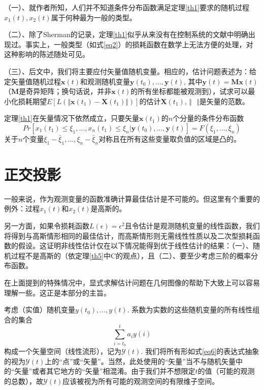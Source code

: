 \documentclass[UTF8,adobefonts]{ctexart}
\begin{document}
{}（一）、就作者所知，人们并不知道条件分布函数满足定理\ref{th1}要求的随机过程${x_1(t),x_2(t)}$属于何种最为一般的类型。

（二）、除了Sherman的记录，定理\ref{th1}似乎从来没有在控制系统的文献中明确出现过。事实上，一般类型（如式\ref{eq2}）的损耗函数在数学上无法方便的处理，对这种影响的陈述随处可见。

（三）、后文中，我们将主要应付矢量值随机变量。相应的，估计问题表述为：给定矢量值随机过程${\mathbf{x}(t)}$和观测随机变量$\mathbf{y}(t_0),\dotsc,\mathbf{y}(t)$, 其中$\mathbf{y}(t)=\mathbf{Mx}(t)$（$\mathbf{M}$是奇异矩阵；换句话说，并非$\mathbf{x}(t)$的所有坐标都能被观测到），试求可以最小化损耗期望$E[L(\Vert\mathbf{x}(t_1)-\mathbf{X}(t_1)\Vert)]$的估计$\mathbf{X}(t_1)$, $\Vert\text{ }\Vert$是矢量的范数。

定理\ref{th1}在矢量情况下依然成立，只要矢量$\mathbf{x}(t_1)$的$n$个分量的条件分布函数
\begin{equation*}
Pr[x_1(t_1) \le \xi_1,\dotsc,x_n(t_1) \le \xi_n \vert \mathbf{y}(t_0),\dotsc,\mathbf{y}(t)]=F(\xi_1,\dotsc,\xi_n)
\end{equation*}
关于$n$个变量$\xi_1-\bar{\xi}_1,\dotsc,\xi_n-\bar{\xi}_n$对称且在所有这些变量取负值的区域是凸的。


\section{正交投影}
一般来说，作为观测变量的函数准确计算最佳估计是不可能的。但这里有个重要的例外：过程${x_1(t)}$和${x_2(t)}$是高斯的。

另一方面，如果令损耗函数$L(\epsilon)=\epsilon^2$且令估计是观测随机变量的线性函数，我们将得到与高斯情形相同的最佳估计，而高斯情形则无需线性性质以及二次型损耗函数的假设。这证明非线性估计仅在以下情况能得到优于线性估计的结果：（一）、随机过程不是高斯的（依定理\ref{th5}中C的观点），且（二）、要至少考虑三阶的概率分布函数。

在上面提到的特殊情况中，显式求解估计问题在几何图像的帮助下大致上可以容易理解一些。这正是本部分的主旨。

考虑（实值）随机变量$y(t_0),\dotsc,y(t)$. 系数为实数的这些随机变量的所有线性组合的集合
\begin{equation}
\label{eq6}
\sum^t_{i=t_0}a_i y(i)
\end{equation}
构成一个矢量空间（线性流形），记为$\mathbf{\mathcal{Y}}(t)$. 我们将所有形如式\ref{eq6}的表达式抽象的视为$\mathbf{\mathcal{Y}}(t)$上的“点”或“矢量”。当然，此处使用的“矢量”当不与随机矢量中的“矢量”或者其它地方的“矢量”相混淆。由于我们并不想限定$t$的值（可能的观测的总数），故$\mathbf{\mathcal{Y}}(t)$应该被视为所有可能的观测空间的有限维子空间。
\end{document}

